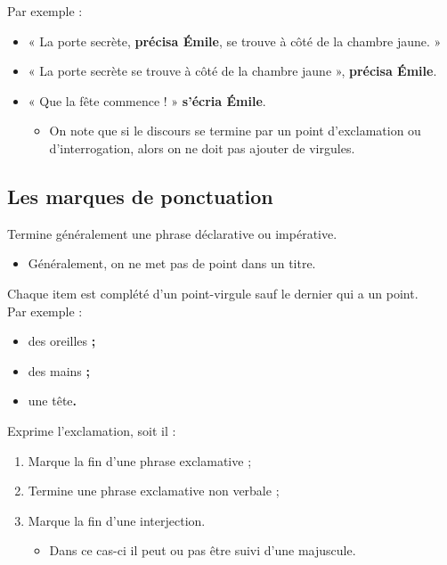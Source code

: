 \documentclass[10pt, french]{article}
\begin{document}
\begin{multicols*}{2}
\begin{definitionNOHFILL}
Par exemple : 
\begin{itemize}
	\item	« La porte secrète, \textbf{précisa Émile}, se trouve à côté de la chambre jaune. »
	\item	« La porte secrète se trouve à côté de la chambre jaune », \textbf{précisa Émile}.
	\item	« Que la fête commence ! » \textbf{s'écria Émile}.
		\begin{itemize}
		\item	On note que si le discours se termine par un point d'exclamation ou d'interrogation, alors on ne doit pas ajouter de virgules.
		\end{itemize}
\end{itemize}
\end{definitionNOHFILL}


\columnbreak
\subsection{Les marques de ponctuation}
\begin{definitionNOHFILL}[Le point (.)]
Termine généralement une phrase déclarative ou impérative.\\

\begin{itemize}
	\item	Généralement, on ne met pas de point dans un titre.
\end{itemize}
\end{definitionNOHFILL}

\begin{astuces}
Chaque item est complété d'un point-virgule sauf le dernier qui a un point.\\

Par exemple :
\begin{itemize}
	\item	des oreilles \textbf{;}
	\item	des mains \textbf{;}
	\item	une tête\textbf{.}
\end{itemize}
\end{astuces}

\begin{definitionNOHFILLprop}
Exprime l'exclamation, soit il :
\begin{enumerate}
	\item	Marque la fin d'une phrase exclamative ;
	\item	Termine une phrase exclamative non verbale ;
	\item	Marque la fin d'une interjection.
		\begin{itemize}
		\item	Dans ce cas-ci il peut ou pas être suivi d'une majuscule.
		\end{itemize}
\end{enumerate}
\end{definitionNOHFILLprop}


\end{multicols*}
\end{document}
